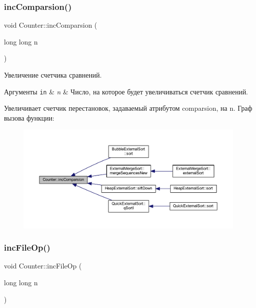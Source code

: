 \subsubsection{\texorpdfstring{inc\+Comparsion()}{incComparsion()}}
{\footnotesize\ttfamily void Counter\+::inc\+Comparsion (\begin{DoxyParamCaption}\item[{long long}]{n }\end{DoxyParamCaption})}



Увеличение счетчика сравнений. 


\begin{DoxyParams}[1]{Аргументы}
\mbox{\tt in}  & {\em n} & Число, на которое будет увеличиваться счетчик сравнений.\\
\hline
\end{DoxyParams}
Увеличивает счетчик перестановок, задаваемый атрибутом comparsion, на n. Граф вызова функции\+:\nopagebreak
\begin{figure}[H]
\begin{center}
\leavevmode
\includegraphics[width=350pt]{class_counter_a224d93150c0fe2982d3efd7aa99668e6_icgraph}
\end{center}
\end{figure}
\hypertarget{class_counter_a63310182709c321ad8fe8e78b81d12aa}{}\label{class_counter_a63310182709c321ad8fe8e78b81d12aa} 
\subsubsection{\texorpdfstring{inc\+File\+Op()}{incFileOp()}}
{\footnotesize\ttfamily void Counter\+::inc\+File\+Op (\begin{DoxyParamCaption}\item[{long long}]{n }\end{DoxyParamCaption})}



